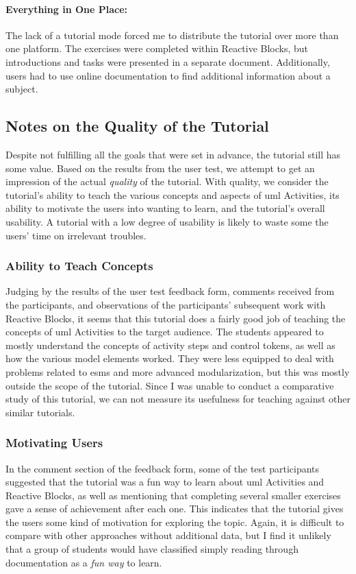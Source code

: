 \paragraph{Everything in One Place:} The lack of a tutorial mode forced me to distribute the tutorial over more than one platform. The exercises were completed within Reactive Blocks, but introductions and tasks were presented in a separate document. Additionally, users had to use online documentation to find additional information about a subject.

\subsection{Notes on the Quality of the Tutorial}
\label{sec:tutorial_quality}
Despite not fulfilling all the goals that were set in advance, the tutorial still has some value. Based on the results from the user test, we attempt to get an impression of the actual \emph{quality} of the tutorial. With quality, we consider the tutorial's ability to teach the various concepts and aspects of \gls{uml} Activities, its ability to motivate the users into wanting to learn, and the tutorial's overall usability. A tutorial with a low degree of usability is likely to waste some the users' time on irrelevant troubles.

\subsubsection{Ability to Teach Concepts}
Judging by the results of the user test feedback form, comments received from the participants, and observations of the participants' subsequent work with Reactive Blocks, it seems that this tutorial does a fairly good job of teaching the concepts of \gls{uml} Activities to the target audience. The students appeared to mostly understand the concepts of activity steps and control tokens, as well as how the various model elements worked. They were less equipped to deal with problems related to \glspl{esm} and more advanced modularization, but this was mostly outside the scope of the tutorial. Since I was unable to conduct a comparative study of this tutorial, we can not measure its usefulness for teaching against other similar tutorials.

\subsubsection{Motivating Users}
In the comment section of the feedback form, some of the test participants suggested that the tutorial was a fun way to learn about \gls{uml} Activities and Reactive Blocks, as well as mentioning that completing several smaller exercises gave a sense of achievement after each one. This indicates that the tutorial gives the users some kind of motivation for exploring the topic. Again, it is difficult to compare with other approaches without additional data, but I find it unlikely that a group of students would have classified simply reading through documentation as a \emph{fun way} to learn.

